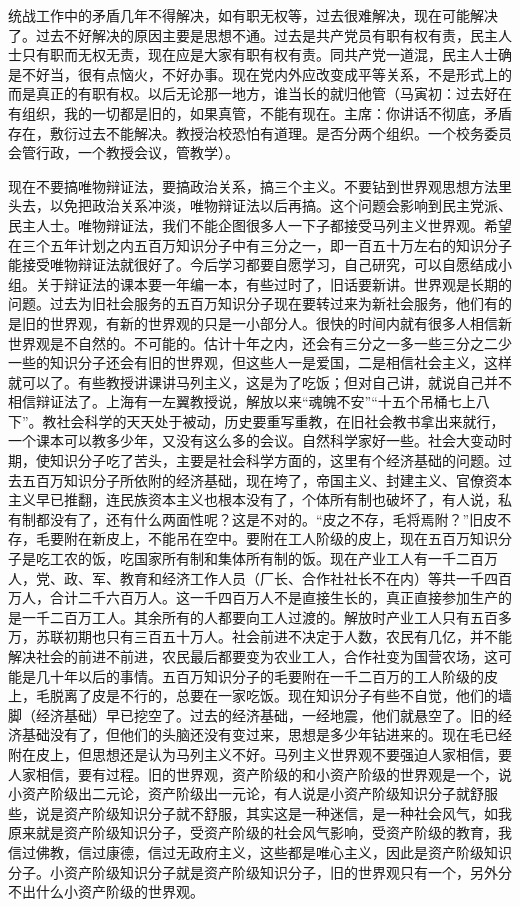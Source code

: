 统战工作中的矛盾几年不得解决，如有职无权等，过去很难解决，现在可能解决了。过去不好解决的原因主要是思想不通。过去是共产党员有职有权有责，民主人士只有职而无权无责，现在应是大家有职有权有责。同共产党一道混，民主人士确是不好当，很有点恼火，不好办事。现在党内外应改变成平等关系，不是形式上的而是真正的有职有权。以后无论那一地方，谁当长的就归他管（马寅初：过去好在有组织，我的一切都是旧的，如果真管，不能有现在。主席：你讲话不彻底，矛盾存在，敷衍过去不能解决。教授治校恐怕有道理。是否分两个组织。一个校务委员会管行政，一个教授会议，管教学）。

现在不要搞唯物辩证法，要搞政治关系，搞三个主义。不要钻到世界观思想方法里头去，以免把政治关系冲淡，唯物辩证法以后再搞。这个问题会影响到民主党派、民主人士。唯物辩证法，我们不能企图很多人一下子都接受马列主义世界观。希望在三个五年计划之内五百万知识分子中有三分之一，即一百五十万左右的知识分子能接受唯物辩证法就很好了。今后学习都要自愿学习，自己研究，可以自愿结成小组。关于辩证法的课本要一年编一本，有些过时了，旧话要新讲。世界观是长期的问题。过去为旧社会服务的五百万知识分子现在要转过来为新社会服务，他们有的是旧的世界观，有新的世界观的只是一小部分人。很快的时间内就有很多人相信新世界观是不自然的。不可能的。估计十年之内，还会有三分之一多一些三分之二少一些的知识分子还会有旧的世界观，但这些人一是爱国，二是相信社会主义，这样就可以了。有些教授讲课讲马列主义，这是为了吃饭；但对自己讲，就说自己并不相信辩证法了。上海有一左翼教授说，解放以来“魂魄不安”“十五个吊桶七上八下”。教社会科学的天天处于被动，历史要重写重教，在旧社会教书拿出来就行，一个课本可以教多少年，又没有这么多的会议。自然科学家好一些。社会大变动时期，使知识分子吃了苦头，主要是社会科学方面的，这里有个经济基础的问题。过去五百万知识分子所依附的经济基础，现在垮了，帝国主义、封建主义、官僚资本主义早已推翻，连民族资本主义也根本没有了，个体所有制也破坏了，有人说，私有制都没有了，还有什么两面性呢？这是不对的。“皮之不存，毛将焉附？”旧皮不存，毛要附在新皮上，不能吊在空中。要附在工人阶级的皮上，现在五百万知识分子是吃工农的饭，吃国家所有制和集体所有制的饭。现在产业工人有一千二百万人，党、政、军、教育和经济工作人员（厂长、合作社社长不在内）等共一千四百万人，合计二千六百万人。这一千四百万人不是直接生长的，真正直接参加生产的是一千二百万工人。其余所有的人都要向工人过渡的。解放时产业工人只有五百多万，苏联初期也只有三百五十万人。社会前进不决定于人数，农民有几亿，并不能解决社会的前进不前进，农民最后都要变为农业工人，合作社变为国营农场，这可能是几十年以后的事情。五百万知识分子的毛要附在一千二百万的工人阶级的皮上，毛脱离了皮是不行的，总要在一家吃饭。现在知识分子有些不自觉，他们的墙脚（经济基础）早已挖空了。过去的经济基础，一经地震，他们就悬空了。旧的经济基础没有了，但他们的头脑还没有变过来，思想是多少年钻进来的。现在毛已经附在皮上，但思想还是认为马列主义不好。马列主义世界观不要强迫人家相信，要人家相信，要有过程。旧的世界观，资产阶级的和小资产阶级的世界观是一个，说小资产阶级出二元论，资产阶级出一元论，有人说是小资产阶级知识分子就舒服些，说是资产阶级知识分子就不舒服，其实这是一种迷信，是一种社会风气，如我原来就是资产阶级知识分子，受资产阶级的社会风气影响，受资产阶级的教育，我信过佛教，信过康德，信过无政府主义，这些都是唯心主义，因此是资产阶级知识分子。小资产阶级知识分子就是资产阶级知识分子，旧的世界观只有一个，另外分不出什么小资产阶级的世界观。

